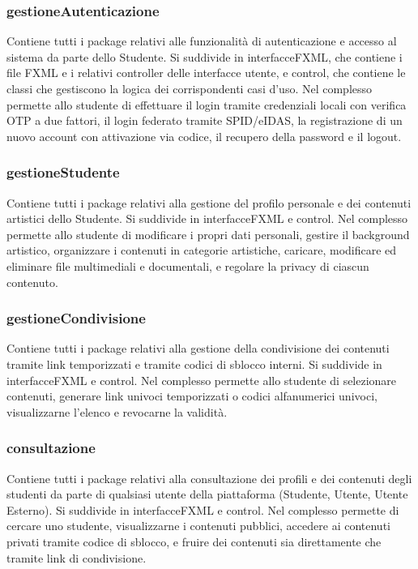\documentclass[12pt,a4paper]{article}
\begin{document}
\subsubsection{gestioneAutenticazione}

Contiene tutti i package relativi alle funzionalità di autenticazione e accesso al sistema da parte dello Studente. Si suddivide in interfacceFXML, che contiene i file FXML e i relativi controller delle interfacce utente, e control, che contiene le classi che gestiscono la logica dei corrispondenti casi d'uso. Nel complesso permette allo studente di effettuare il login tramite credenziali locali con verifica OTP a due fattori, il login federato tramite SPID/eIDAS, la registrazione di un nuovo account con attivazione via codice, il recupero della password e il logout.

\subsubsection{gestioneStudente}

Contiene tutti i package relativi alla gestione del profilo personale e dei contenuti artistici dello Studente. Si suddivide in interfacceFXML e control. Nel complesso permette allo studente di modificare i propri dati personali, gestire il background artistico, organizzare i contenuti in categorie artistiche, caricare, modificare ed eliminare file multimediali e documentali, e regolare la privacy di ciascun contenuto.

\subsubsection{gestioneCondivisione}

Contiene tutti i package relativi alla gestione della condivisione dei contenuti tramite link temporizzati e tramite codici di sblocco interni. Si suddivide in interfacceFXML e control. Nel complesso permette allo studente di selezionare contenuti, generare link univoci temporizzati o codici alfanumerici univoci, visualizzarne l'elenco e revocarne la validità.

\subsubsection{consultazione}

Contiene tutti i package relativi alla consultazione dei profili e dei contenuti degli studenti da parte di qualsiasi utente della piattaforma (Studente, Utente, Utente Esterno). Si suddivide in interfacceFXML e control. Nel complesso permette di cercare uno studente, visualizzarne i contenuti pubblici, accedere ai contenuti privati tramite codice di sblocco, e fruire dei contenuti sia direttamente che tramite link di condivisione.
\end{document}
